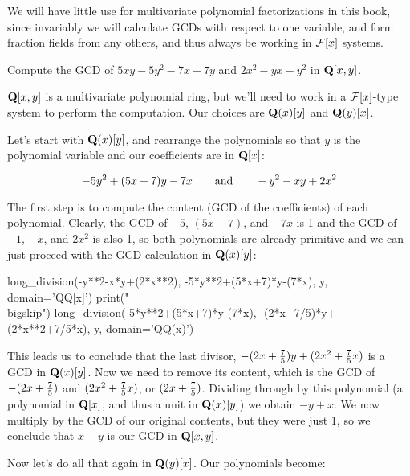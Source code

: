 We will have little use for multivariate polynomial factorizations in
this book, since invariably we will calculate GCDs with respect to one
variable, and form fraction fields from any others, and thus always be
working in ${\cal F}[x]$ systems.



\example

Compute the GCD of $5xy-5y^2-7x+7y$ and $2x^2-yx-y^2$ in ${\bf Q}[x,y]$.

${\bf Q}[x,y]$ is a multivariate polynomial ring, but we'll need to
work in a ${\cal F}[x]$-type system to perform the computation.  Our
choices are ${\bf Q}(x)[y]$ and ${\bf Q}(y)[x]$.

Let's start with ${\bf Q}(x)[y]$, and rearrange the polynomials
so that $y$ is the polynomial variable and our coefficients
are in ${\bf Q}[x]$:

$$-5y^2+(5x+7)y-7x {\rm\qquad and\qquad} -y^2-xy+2x^2$$

The first step is to compute the content (GCD of the coefficients) of
each polynomial.  Clearly, the GCD of $-5$, $(5x+7)$, and $-7x$ is 1
and the GCD of $-1$, $-x$, and $2x^2$ is also 1, so both polynomials
are already primitive and we can just proceed with the GCD calculation
in ${\bf Q}(x)[y]$:

\begin{sympycode}
long_division(-y**2-x*y+(2*x**2), -5*y**2+(5*x+7)*y-(7*x), y, domain='QQ[x]')
print("\\bigskip")
long_division(-5*y**2+(5*x+7)*y-(7*x), -(2*x+7/5)*y+(2*x**2+7/5*x), y, domain='QQ(x)')
\end{sympycode}


This leads us to conclude that the last divisor,
$-(2x+{7\over5})y+(2x^2+{7\over5}x)$ is a GCD in ${\bf Q}(x)[y]$.  Now
we need to remove its content, which is the GCD of $-(2x+{7\over5})$
and $(2x^2+{7\over5}x)$, or $(2x+{7\over5})$.  Dividing through by
this polynomial (a polynomial in ${\bf Q}[x]$, and thus a unit in
${\bf Q}(x)[y]$) we obtain $-y+x$.  We now multiply by the GCD of our
original contents, but they were just 1, so we conclude that $x-y$
is our GCD in ${\bf Q}[x,y]$.

Now let's do all that again in ${\bf Q}(y)[x]$.  Our polynomials become:

